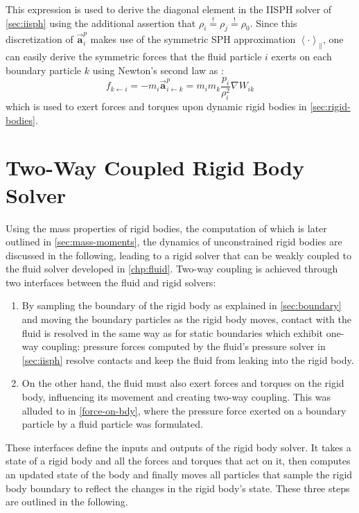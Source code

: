 \documentclass[oneside, a4paper]{book}
\newcommand\angled[1]{\left\langle#1\right\rangle}
\newcommand\vek[1]{\vec{\bm{#1}}}
\begin{document}
    This expression is used to derive the diagonal element in the IISPH solver of \autoref{sec:iisph} using the additional assertion that $\rho_i\overset{!}{=}\rho_j\overset{!}{=}\rho_0$. Since this discretization of $\vek{a}_i^p$ makes use of the symmetric SPH approximation $\angled{\cdot}_\parallel$, one can easily derive the symmetric forces that the fluid particle $i$ exerts on each boundary particle $k$ using Newton's second law as \autocite{versatile-boundary-akinci}:
    \begin{equation}\label{force-on-bdy}
      f_{k\leftarrow i} = - m_i \vek{a}_{i\leftarrow k}^p = m_i m_k\frac{p_i}{\rho_i^2} \nabla W_{ik}
    \end{equation}
    which is used to exert forces and torques upon dynamic rigid bodies in \autoref{sec:rigid-bodies}.


    \section{Two-Way Coupled Rigid Body Solver}\label{sec:rigid-bodies}
    Using the mass properties of rigid bodies, the computation of which is later outlined in \autoref{sec:mass-moments}, the dynamics of unconstrained rigid bodies are discussed in the following, leading to a rigid solver that can be weakly coupled to the fluid solver developed in \autoref{chp:fluid}. Two-way coupling is achieved through two interfaces between the fluid and rigid solvers:
    \begin{enumerate}
      \item By sampling the boundary of the rigid body as explained in \autoref{sec:boundary} and moving the boundary particles as the rigid body moves, contact with the fluid is resolved in the same way as for static boundaries which exhibit one-way coupling: pressure forces computed by the fluid's pressure solver in \autoref{sec:iisph} resolve contacts and keep the fluid from leaking into the rigid body.
      \item On the other hand, the fluid must also exert forces and torques on the rigid body, influencing its movement and creating two-way coupling. This was alluded to in \autoref{force-on-bdy}, where the pressure force exerted on a boundary particle by a fluid particle was formulated.
    \end{enumerate}

    These interfaces define the inputs and outputs of the rigid body solver. It takes a state of a rigid body and all the forces and torques that act on it, then computes an updated state of the body and finally moves all particles that sample the rigid body boundary to reflect the changes in the rigid body's state.
    These three steps are outlined in the following.
\end{document}
